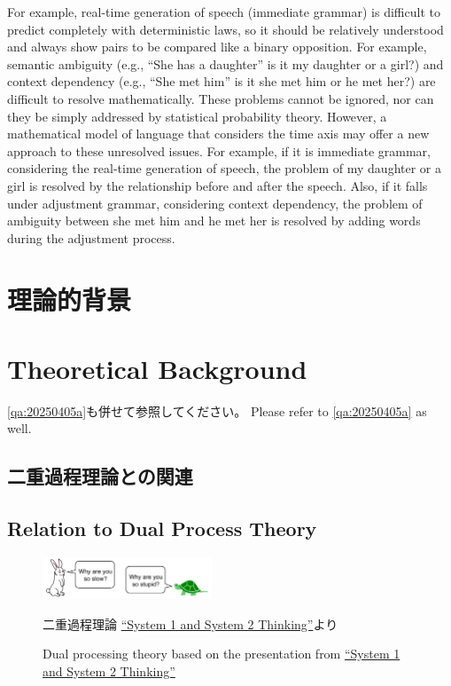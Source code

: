 \documentclass[a4paper,xelatex,ja=standard]{bxjsarticle}
\begin{document}
For example, real-time generation of speech (immediate grammar) is difficult to predict completely with deterministic laws, so it should be relatively understood and always show pairs to be compared like a binary opposition.
For example, semantic ambiguity (e.g., ``She has a daughter'' is it my daughter or a girl?) and context dependency (e.g., ``She met him'' is it she met him or he met her?) are difficult to resolve mathematically.
These problems cannot be ignored, nor can they be simply addressed by statistical probability theory.
However, a mathematical model of language that considers the time axis may offer a new approach to these unresolved issues.
For example, if it is immediate grammar, considering the real-time generation of speech, the problem of my daughter or a girl is resolved by the relationship before and after the speech.
Also, if it falls under adjustment grammar, considering context dependency, the problem of ambiguity between she met him and he met her is resolved by adding words during the adjustment process.
    \fi

\ifJPN
\section{理論的背景}
\else
\section{Theoretical Background}
\fi

\ifJPN
\ref{qa:20250405a}も併せて参照してください。
\else
Please refer to \ref{qa:20250405a} as well.
\fi

\ifJPN
  \subsection{二重過程理論との関連}
\else
  \subsection{Relation to Dual Process Theory}
\fi

\begin{figure}[htb]\centering\small
\includegraphics[width=0.45\textwidth]{./figures/fastslow01.pdf} 
\ifJPN
  \caption{二重過程理論 \href{https://thedecisionlab.com/reference-guide/philosophy/system-1-and-system-2-thinking}{``System 1 and System 2 Thinking''}より}\label{fig:fastslow01}
\else
  \caption{Dual processing theory based on the presentation from \href{https://thedecisionlab.com/reference-guide/philosophy/system-1-and-system-2-thinking}{``System 1 and System 2 Thinking''}}\label{fig:fastslow01}
\fi
\end{figure}
\end{document}
